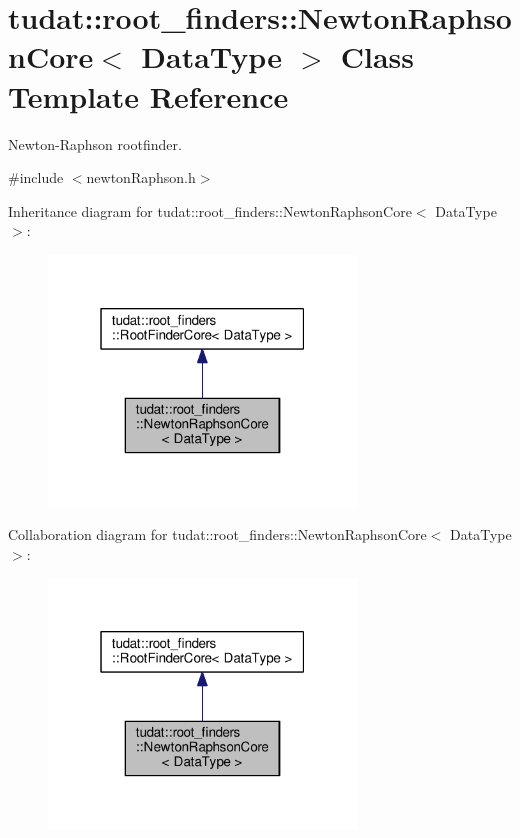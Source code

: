 \hypertarget{classtudat_1_1root__finders_1_1NewtonRaphsonCore}{}\section{tudat\+:\+:root\+\_\+finders\+:\+:Newton\+Raphson\+Core$<$ Data\+Type $>$ Class Template Reference}
\label{classtudat_1_1root__finders_1_1NewtonRaphsonCore}


Newton-\/\+Raphson rootfinder.  




{\ttfamily \#include $<$newton\+Raphson.\+h$>$}



Inheritance diagram for tudat\+:\+:root\+\_\+finders\+:\+:Newton\+Raphson\+Core$<$ Data\+Type $>$\+:
\nopagebreak
\begin{figure}[H]
\begin{center}
\leavevmode
\includegraphics[width=232pt]{classtudat_1_1root__finders_1_1NewtonRaphsonCore__inherit__graph}
\end{center}
\end{figure}


Collaboration diagram for tudat\+:\+:root\+\_\+finders\+:\+:Newton\+Raphson\+Core$<$ Data\+Type $>$\+:
\nopagebreak
\begin{figure}[H]
\begin{center}
\leavevmode
\includegraphics[width=232pt]{classtudat_1_1root__finders_1_1NewtonRaphsonCore__coll__graph}
\end{center}
\end{figure}
